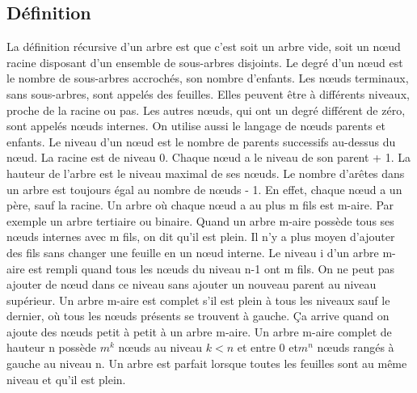 \documentclass[10pt]{article}
\begin{document}
\subsection{Définition}
La définition récursive d'un arbre est que c'est soit un arbre vide, soit un nœud racine disposant d'un ensemble de sous-arbres disjoints.  
\newline \newline 
Le degré d'un nœud est le nombre de sous-arbres accrochés, son nombre d'enfants. Les nœuds terminaux, sans sous-arbres, sont appelés des feuilles. Elles peuvent être à différents niveaux, proche de la racine ou pas. Les autres nœuds, qui ont un degré différent de zéro, sont appelés nœuds internes. On utilise aussi le langage de nœuds parents et enfants. 
\newline \newline 
Le niveau d'un nœud est le nombre de parents successifs au-dessus du nœud. La racine est de niveau 0. Chaque nœud a le niveau de son parent + 1. La hauteur de l'arbre est le niveau maximal de ses nœuds.  
\newline \newline 
Le nombre d'arêtes dans un arbre est toujours égal au nombre de nœuds - 1. En effet, chaque nœud a un père, sauf la racine.  
\newline \newline 
Un arbre où chaque nœud a au plus m fils est m-aire. Par exemple un arbre tertiaire ou binaire. Quand un arbre m-aire possède tous ses nœuds internes avec m fils, on dit qu'il est plein. Il n'y a plus moyen d'ajouter des fils sans changer une feuille en un nœud interne. Le niveau i d'un arbre m-aire est rempli quand tous les nœuds du niveau n-1 ont m fils. On ne peut pas ajouter de nœud dans ce niveau sans ajouter un nouveau parent au niveau supérieur. 
\newline \newline 
Un arbre m-aire est complet s'il est plein à tous les niveaux sauf le dernier, où tous les nœuds présents se trouvent à gauche. Ça arrive quand on ajoute des nœuds petit à petit à un arbre m-aire.  
\newline \newline 
Un arbre m-aire complet de hauteur n possède $m^k$ nœuds au niveau $k < n$ et entre 0 et$ m^n$ nœuds rangés à gauche au niveau n. 
\newline \newline 
Un arbre est parfait lorsque toutes les feuilles sont au même niveau et qu'il est plein. 
\end{document}
